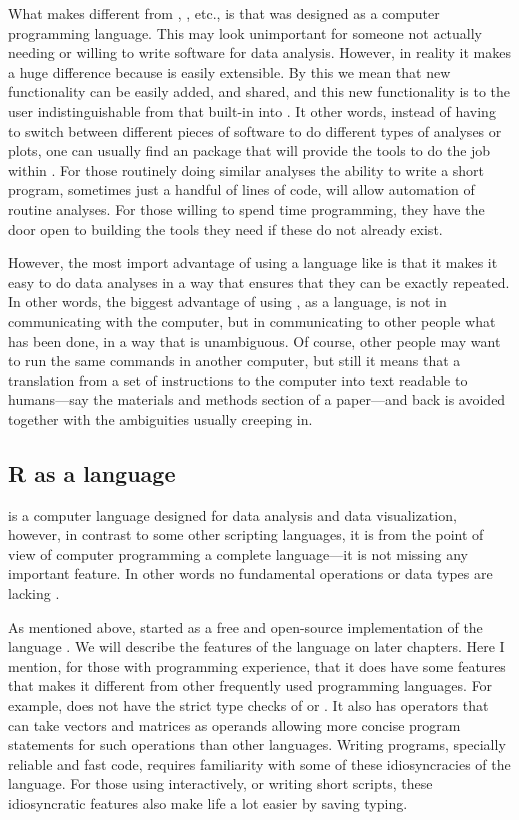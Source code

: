 \documentclass[krantz2]{krantz}\usepackage{knitr}%
\begin{document}
What makes \Rlang different from , , etc., is that \Slang was designed as a computer programming language. This may look unimportant for someone not actually needing or willing to write software for data analysis. However, in reality it makes a huge difference because \Rlang is easily extensible. By this we mean that new functionality can be easily added, and shared, and this new functionality is to the user indistinguishable from that built-in into \Rlang. It other words, instead of having to switch between different pieces of software to do different types of analyses or plots, one can usually find an \Rlang package that will provide the tools to do the job within \Rlang. For those routinely doing similar analyses the ability to write a short program, sometimes just a handful of lines of code, will allow automation of routine analyses. For those willing to spend time programming, they have the door open to building the tools they need if these do not already exist.

However, the most import advantage of using a language like \Rlang is that it makes it easy to do data analyses in a way that ensures that they can be exactly repeated. In other words, the biggest advantage of using \Rlang, as a language, is not in communicating with the computer, but in communicating to other people what has been done, in a way that is unambiguous. Of course, other people may want to run the same commands in another computer, but still it means that a translation from a set of instructions to the computer into text readable to humans---say the materials and methods section of a paper---and back is avoided together with the ambiguities usually creeping in.

\subsection{R as a language}
\Rlang is a computer language designed for data analysis and data visualization, however, in contrast to some other scripting languages, it is from the point of view of computer programming a complete language---it is not missing any important feature. In other words no fundamental operations or data types are lacking \autocite{Chambers2016}.

As mentioned above, \Rlang started as a free and open-source implementation of the \Slang language \autocite{Becker1984,Becker1988}. We will describe the features of the \Rlang language on later chapters. Here I mention, for those with programming experience, that it does have some features that makes it different from other frequently used programming languages. For example, \Rlang does not have the strict type checks of  or  \Cpplang. It also has operators that can take vectors and matrices as operands allowing more concise program statements for such operations than other languages. Writing programs, specially reliable and fast code, requires familiarity with some of these idiosyncracies of the \Rlang language. For those using \Rpgrm interactively, or writing short scripts, these idiosyncratic features also make life a lot easier by saving typing.
\end{document}
